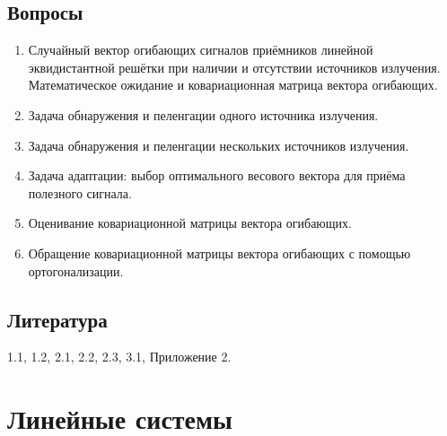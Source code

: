 \documentclass[a4paper,12pt]{article}
\newenvironment{Matlab}{\par \vspace{0.2cm}}{\vspace{0.2cm} \par}
\newcommand{\Mcommand}[1]{\noindent \texttt{> #1} \par}
\newcommand{\matlab}[1]{\begin{Matlab} \Mcommand{#1} \end{Matlab}}
\begin{document}





\subsection{Вопросы}

\begin{enumerate}
    \item Случайный вектор огибающих сигналов приёмников линейной эквидистантной решётки при наличии и отсутствии источников излучения.
        Математическое ожидание и ковариационная матрица вектора огибающих.
    \item Задача обнаружения и пеленгации одного источника излучения.
    \item Задача обнаружения и пеленгации нескольких источников излучения.
    \item Задача адаптации: выбор оптимального весового вектора для приёма полезного сигнала.
    \item Оценивание ковариационной матрицы вектора огибающих.
    \item Обращение ковариационной матрицы вектора огибающих с помощью ортогонализации.
\end{enumerate}

\subsection{Литература}

\cite{Ratynskiy} 1.1, 1.2, 2.1, 2.2, 2.3, 3.1, Приложение 2.

\section{Линейные системы}
\end{document}
